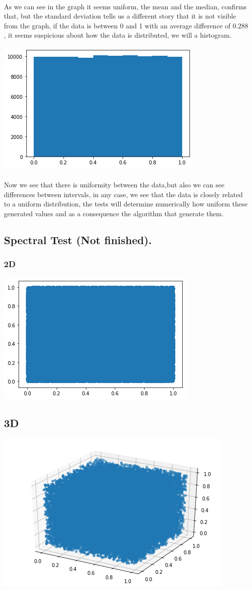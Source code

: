 \documentclass{article}
\begin{document}
\paragraph{}As we can see in the graph it seems  uniform, the mean and the median, confirms that, but the standard deviation tells us a different story that it is not visible from the graph, if the data is between 0 and 1 with an average difference of $0.288$, it seems suspicious about how the data is distributed, we will a histogram.
\begin{center}
	\includegraphics[width=0.5\linewidth]{histogram.png}
\end{center}
\paragraph{} Now we see that there is uniformity between the data,but also we can see differences between intervals, in any case, we see that the data is closely related to a uniform distribution, the tests will determine numerically how uniform these generated values and as a consequence the algorithm that generate them.
\subsection{Spectral Test (Not finished).}
\subsubsection{2D}
\begin{center}
	\includegraphics[width=0.5\linewidth]{2d_scatter.png}
\end{center}
\subsection{3D}
\begin{center}
	\includegraphics[width=0.5\linewidth]{3d_scatter.png}
\end{center}
\end{document}
